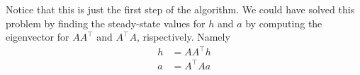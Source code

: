 \begin{enumerate}
  Notice that this is just the first step of the algorithm. We could have solved
  this problem by finding the steady-state values for $h$ and $a$ by computing
  the eigenvector for $AA^\top$ and $A^\top A$, rispectively. Namely
  \begin{align*}
    h &= AA^\top h \\
    a &= A^\top A a
  \end{align*}

\end{enumerate}
